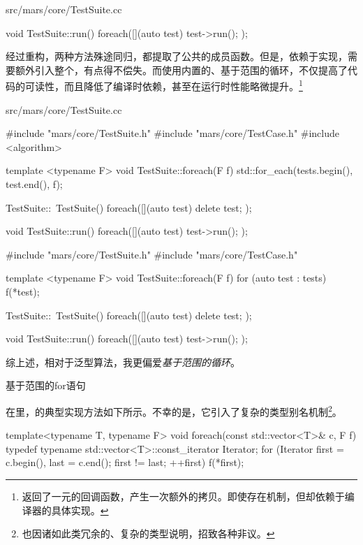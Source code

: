 \begin{content}
\begin{nodiff}{src/mars/core/TestSuite.cc}
\begin{c++}
void TestSuite::run() {
  foreach([](auto test){
    test->run();
  });
}
 \end{c++}
\end{nodiff}

经过重构，两种方法殊途同归，都提取了公共的成员函数。但是，依赖于实现，需要额外引入整个，有点得不偿失。而使用内置的、基于范围的循环，不仅提高了代码的可读性，而且降低了编译时依赖，甚至在运行时性能略微提升。\footnote{返回了一元的回调函数，产生一次额外的拷贝。即使存在机制，但却依赖于编译器的具体实现。}

\begin{diff}{src/mars/core/TestSuite.cc}
 \begin{minicpp}
#include "mars/core/TestSuite.h"
#include "mars/core/TestCase.h"
#include <algorithm>

template <typename F>
void TestSuite::foreach(F f) {
  std::for_each(tests.begin(), test.end(), f);
}

TestSuite::~TestSuite() {
  foreach([](auto test){
    delete test;
  });
}

void TestSuite::run() {
  foreach([](auto test){
    test->run();
  });
}
 \end{minicpp}
\tcblower
 \begin{minicpp}
#include "mars/core/TestSuite.h"
#include "mars/core/TestCase.h"

template <typename F>
void TestSuite::foreach(F f) {
  for (auto test : tests) {
    f(*test);
  }
}

TestSuite::~TestSuite() {
  foreach([](auto test) {
    delete test;
  });
}

void TestSuite::run() {
  foreach([](auto test){
    test->run();
  });
}
 \end{minicpp}
\end{diff}

综上述，相对于泛型算法，我更偏爱\emph{基于范围的循环}。

\begin{episode}{基于范围的for语句}
\begin{content}

在里，的典型实现方法如下所示。不幸的是，它引入了复杂的类型别名机制\footnote{\cpp{}也因诸如此类冗余的、复杂的类型说明，招致各种非议。}。

 \begin{c++}[title={\ttfamily{实现foreach：应用for循环，C++98}}]
template<typename T, typename F>
void foreach(const std::vector<T>& c, F f) {
  typedef typename std::vector<T>::const_iterator Iterator;
  for (Iterator first = c.begin(), last = c.end(); first != last; ++first) {
    f(*first);
  }
}
 \end{c++}


\end{content}
\end{episode}
\end{content}

